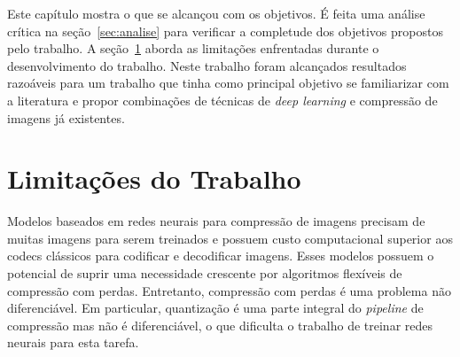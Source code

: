 Este capítulo mostra o que se alcançou com os objetivos. É feita uma análise crítica na seção~\ref{sec:analise} para verificar a completude dos objetivos propostos pelo trabalho. A seção~\ref{sec:limitacoes} aborda as limitações enfrentadas durante o desenvolvimento do trabalho. Neste trabalho foram alcançados resultados razoáveis para um trabalho que tinha como principal objetivo se familiarizar com a literatura e propor combinações de técnicas de \textit{deep learning} e compressão de imagens já existentes.

\section{Limitações do Trabalho}
\label{sec:limitacoes}
Modelos baseados em redes neurais para compressão de imagens precisam de muitas imagens para serem treinados e possuem custo computacional superior aos codecs clássicos para codificar e decodificar imagens. Esses modelos possuem o potencial de suprir uma necessidade crescente por algoritmos flexíveis de compressão com perdas. Entretanto, compressão com perdas é uma problema não diferenciável. Em particular, quantização é uma parte integral do \textit{pipeline} de compressão mas não é diferenciável, o que dificulta o trabalho de treinar redes neurais para esta tarefa.
